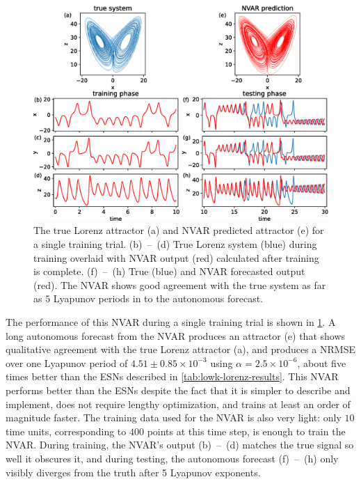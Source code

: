 \begin{figure}
  \includegraphics[width=\textwidth]{figures/nvar-predict-lorenz}
  \caption{The true Lorenz attractor (a) and NVAR predicted attractor
    (e) for a single training trial. (b)~--~(d) True Lorenz system
    (blue) during training overlaid with NVAR output (red) calculated
    after training is complete. (f)~--~(h) True (blue) and NVAR
    forecasted output (red). The NVAR shows good agreement with the
    true system as far as $5$ Lyapunov periods in to the autonomous
    forecast.}
  \label{fig:nvar-predict-lorenz}
\end{figure}

The performance of this NVAR during a single training trial is shown
in \cref{fig:nvar-predict-lorenz}. A long autonomous forecast from the
NVAR produces an attractor (e) that shows qualitative agreement with
the true Lorenz attractor (a), and produces a NRMSE over one Lyapunov
period of $4.51\pm0.85\times10^{-3}$ using $\alpha =
2.5\times10^{-6}$, about five times better than the ESNs described in
\cref{tab:lowk-lorenz-results}. This NVAR performs better than the
ESNs despite the fact that it is simpler to describe and implement,
does not require lengthy optimization, and trains at least an order of
magnitude faster. The training data used for the NVAR is also very
light: only $10$ time units, corresponding to $400$ points at this
time step, is enough to train the NVAR. During training, the NVAR's
output (b)~--~(d) matches the true signal so well it obscures it, and
during testing, the autonomous forecast (f)~--~(h) only visibly
diverges from the truth after 5 Lyapunov exponents.

